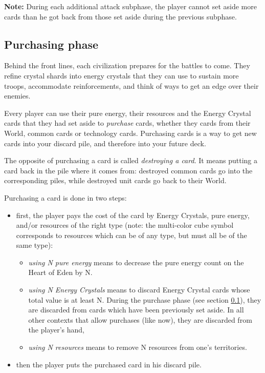 \documentclass[a4paper]{article}
\begin{document}
        \textbf{Note:} During each additional attack subphase,
                              the player cannot set aside more cards than he got back from
                              those set aside during the previous subphase.
        
    
    \subsection{Purchasing phase}
        \label{purchase}
        Behind the front lines, each civilization prepares for the battles to come.
        They refine crystal shards into energy crystals that they can use to
        sustain more troops, accommodate reinforcements,
        and think of ways to get an edge over their enemies.
        
        Every player can use their pure energy, their resources
        and the Energy Crystal cards that they had set aside to \textit{purchase} cards,
        whether they cards from their World, common cards or technology cards.
        Purchasing cards is a way to get new cards into your discard pile,
        and therefore into your future deck.
        
        The opposite of  purchasing a card is called \textit{destroying a card}.
        It means putting a card back in the pile where it comes from:
        destroyed common cards go into the corresponding piles,
        while destroyed unit cards go back to their World.

        Purchasing a card is done in two steps:
        \vspace{-1.3em}
        \begin{itemize}
            \item first, the player pays the cost of the card by Energy Crystals, 
                 pure energy, and/or resources of the right type
                (note: the multi-color cube symbol corresponds to resources
                which can be of any type, but must all be of the same type):
                \vspace{-0.5em}
                \begin{itemize}
                    \item \textit{using N pure energy} means to decrease the
                    pure energy count on the Heart of Eden by N.
                    \item \textit{using N Energy Crystals} means to discard Energy Crystal
                        cards whose total value is at least N.
                        During the purchase phase (see section \ref{purchase}),
                        they are discarded from cards which have been previously set aside.
                        In all other contexts that allow purchases (like now),
                        they are discarded from the player's hand,
                    \item \textit{using N resources} means to remove N resources
                        from one's territories.
                \end{itemize}
            \item then the player puts the purchased card in his discard pile.
        \end{itemize}
        
\end{document}
